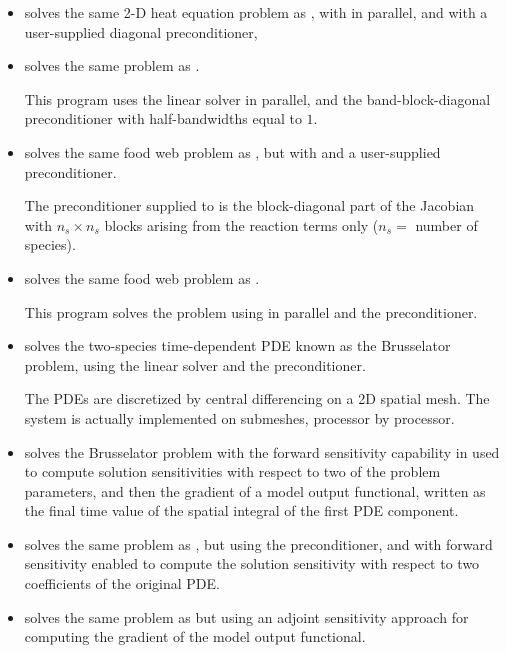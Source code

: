 \begin{itemize}


\item {}
  solves the same 2-D heat equation problem as , with {\sunlinsolspgmr}
  in parallel, and with a user-supplied diagonal preconditioner,
  
\item {}
  solves the same problem as .

  This program uses the {\sunlinsolspgmr} linear solver in parallel,
  and the band-block-diagonal preconditioner {\idabbdpre} with half-bandwidths 
  equal to $1$.

\item {}
  solves the same food web problem as , but with {\sunlinsolspgmr}
  and a user-supplied preconditioner.
  
  The preconditioner supplied to {\sunlinsolspgmr} is the block-diagonal part of 
  the Jacobian with $n_s \times n_s$ blocks arising from the reaction terms only
  ($n_s =$ number of species).

\item {}
  solves the same food web problem as .

  This program solves the problem using {\sunlinsolspgmr} in parallel and the
  {\idabbdpre} preconditioner.

\item {}
  solves the two-species time-dependent PDE known as the Brusselator problem,
  using the {\sunlinsolspgmr} linear solver and the {\idabbdpre} preconditioner.

  The PDEs are discretized by central differencing on a 2D spatial mesh.
  The system is actually implemented on submeshes, processor by processor.


\item {}
  solves the Brusselator problem with the forward sensitivity capability in {\idas}
  used to compute solution sensitivities with respect to two of the problem 
  parameters, and then the gradient of a model output functional, written as
  the final time value of the spatial integral of the first PDE component.

\item {}
  solves the same problem as , but using the {\idabbdpre}
  preconditioner, and with forward sensitivity enabled to compute the solution
  sensitivity with respect to two coefficients of the original PDE.
  

\item {}
  solves the same problem as  but using an adjoint
  sensitivity approach for computing the gradient of the model output functional.

\end{itemize}

